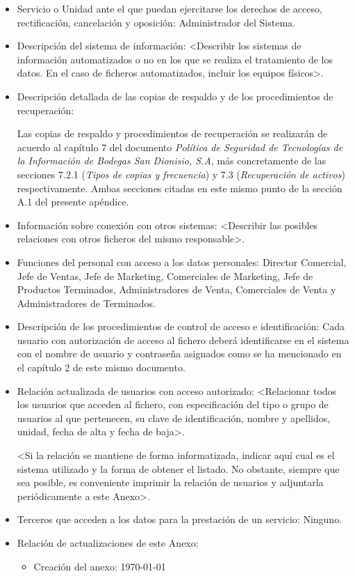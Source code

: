 \documentclass[a4paper,11pt,bibtotoc,noliststotoc]{scrbook}
\begin{document}
\begin{itemize}
\item Servicio o Unidad ante el que puedan ejercitarse los derechos de acceso, rectificación, cancelación y oposición: Administrador del Sistema.

\item Descripción del sistema de información: <Describir los sistemas de información automatizados o no en los que se realiza el tratamiento de los datos. En el caso de ficheros automatizados, incluir los equipos físicos>.

\item Descripción detallada de las copias de respaldo y de los procedimientos de recuperación:

Las copias de respaldo y procedimientos de recuperación se realizarán de acuerdo al capítulo 7 del documento \emph{Política de Seguridad de Tecnologías de la Información de Bodegas San Dionisio, S.A}, más concretamente de las secciones 7.2.1 (\emph{Tipos de copias y frecuencia}) y 7.3 (\emph{Recuperación de activos}) respectivamente. Ambas secciones citadas en este mismo punto de la sección A.1 del presente apéndice.

\item Información sobre conexión con otros sistemas: <Describir las posibles relaciones con otros ficheros del mismo responsable>.

\item Funciones del personal con acceso a los datos personales: Director Comercial, Jefe de Ventas, Jefe de Marketing, Comerciales de Marketing, Jefe de Productos Terminados, Administradores de Venta, Comerciales de Venta y Administradores de Terminados.

\item Descripción de los procedimientos de control de acceso e identificación: Cada usuario con autorización de acceso al fichero deberá identificarse en el sistema con el nombre de usuario y contraseña asignados como se ha mencionado en el capítulo 2 de este mismo documento.

\item Relación actualizada de usuarios con acceso autorizado: <Relacionar todos los usuarios que acceden al fichero, con especificación del tipo o grupo de usuarios al que pertenecen, su clave de identificación, nombre y apellidos, unidad, fecha de alta y fecha de baja>.

<Si la relación se mantiene de forma informatizada, indicar aquí cual es el sistema utilizado y la forma de obtener el listado. No obstante, siempre que sea posible, es conveniente imprimir la relación de usuarios y adjuntarla periódicamente a este Anexo>.

\item Terceros que acceden a los datos para la prestación de un servicio: Ninguno.


\item Relación de actualizaciones de este Anexo: 

	\begin{itemize}
	\item Creación del anexo: \today
	\end{itemize}

\end{itemize}
\end{document}
